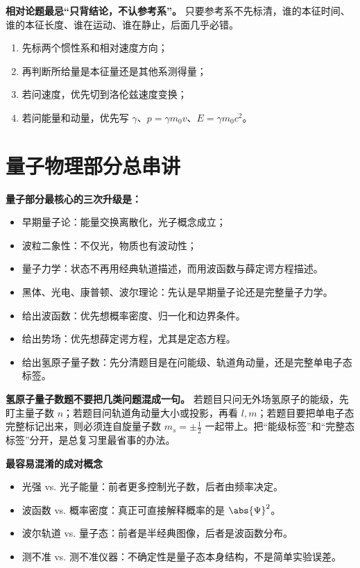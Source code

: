 \documentclass[lang=cn,11pt]{elegantbook}
\begin{document}
\begin{note}
\textbf{相对论题最忌“只背结论，不认参考系”。} 只要参考系不先标清，谁的本征时间、谁的本征长度、谁在运动、谁在静止，后面几乎必错。
\end{note}


\begin{enumerate}
 \item 先标两个惯性系和相对速度方向；
 \item 再判断所给量是本征量还是其他系测得量；
 \item 若问速度，优先切到洛伦兹速度变换；
 \item 若问能量和动量，优先写 \(\gamma\)、\(p=\gamma m_0v\)、\(E=\gamma m_0c^2\)。
\end{enumerate}

\section{量子物理部分总串讲}

\textbf{量子部分最核心的三次升级是：}
\begin{itemize}
 \item 早期量子论：能量交换离散化，光子概念成立；
 \item 波粒二象性：不仅光，物质也有波动性；
 \item 量子力学：状态不再用经典轨道描述，而用波函数与薛定谔方程描述。
\end{itemize}


\begin{itemize}
 \item 黑体、光电、康普顿、波尔理论：先认是早期量子论还是完整量子力学。
 \item 给出波函数：优先想概率密度、归一化和边界条件。
 \item 给出势场：优先想薛定谔方程，尤其是定态方程。
 \item 给出氢原子量子数：先分清题目是在问能级、轨道角动量，还是完整单电子态标签。
\end{itemize}

\begin{note}
\textbf{氢原子量子数题不要把几类问题混成一句。} 若题目只问无外场氢原子的能级，先盯主量子数 \(n\)；若题目问轨道角动量大小或投影，再看 \(l,m\)；若题目要把单电子态完整标记出来，则必须连自旋量子数 \(m_s=\pm \frac12\) 一起带上。把“能级标签”和“完整态标签”分开，是总复习里最省事的办法。
\end{note}

\textbf{最容易混淆的成对概念}
\begin{itemize}
 \item 光强 vs. 光子能量：前者更多控制光子数，后者由频率决定。
 \item 波函数 vs. 概率密度：真正可直接解释概率的是 \(\abs{\Psi}^2\)。
 \item 波尔轨道 vs. 量子态：前者是半经典图像，后者是波函数分布。
 \item 测不准 vs. 测不准仪器：不确定性是量子态本身结构，不是简单实验误差。
\end{itemize}
\end{document}
